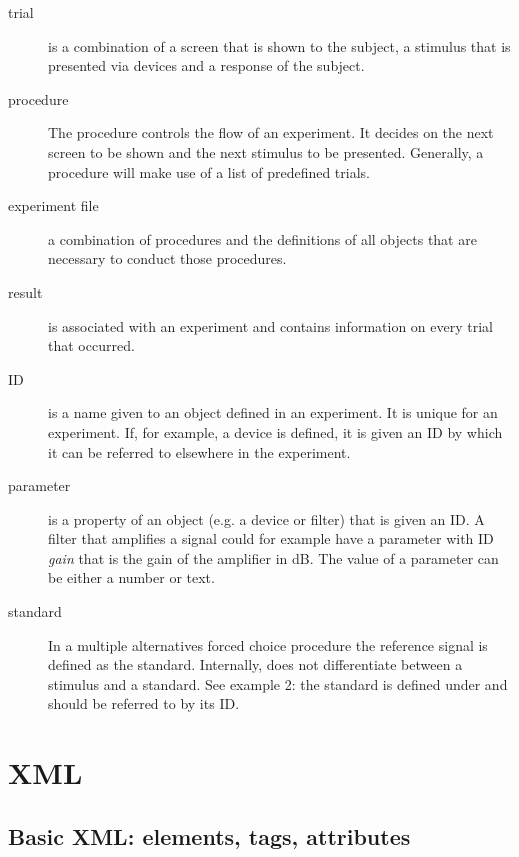 \begin{description}
\item[trial] is a combination of a screen that is shown to the
subject, a stimulus that is presented via devices and a response
of the subject.

\item[procedure] The procedure controls the flow
of an experiment. It decides on the next screen to be shown and
the next stimulus to be presented. Generally, a procedure will
make use of a list of predefined trials.

\item[experiment file] a
combination of procedures and the definitions of all objects that
are necessary to conduct those procedures.

\item[result] is
associated with an experiment and contains information on every
trial that occurred.

\item[ID] is a name given to an object
defined in an experiment. It is unique for an experiment. If, for
example, a device is defined, it is given an ID by which it can be
referred to elsewhere in the experiment.

\item[parameter] is a
property of an object (e.g. a device or filter) that is given an
ID. A filter that amplifies a signal could for example have a
parameter with ID \emph{gain} that is the gain of the amplifier in
dB. The value of a parameter can be either a number or text.

\item[standard] In a multiple alternatives forced choice procedure
the reference signal is defined as the standard. Internally, \apex
does not differentiate between a stimulus and a standard. See
example 2: the standard is defined under  and
should be referred to by its ID.

\end{description}

\section{XML}

\label{sec:xml}

\subsection{Basic XML: elements, tags, attributes}
\label{sec:BasicXML:elements,tags,attributes}

